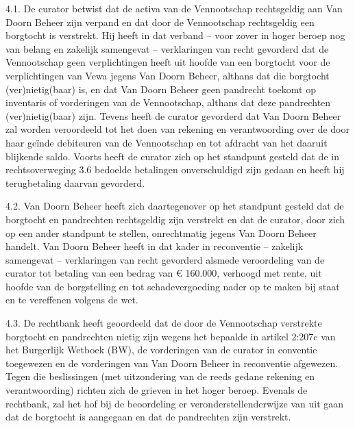 \documentclass[
  dutch,
  a4paper,
]{article}
\begin{document}
4.1. De curator betwist dat de activa van de Vennootschap rechtsgeldig aan Van Doorn Beheer zijn verpand en dat door de Vennootschap rechtsgeldig een borgtocht is verstrekt. Hij heeft in dat verband -- voor zover in hoger beroep nog van belang en zakelijk samengevat -- verklaringen van recht gevorderd dat de Vennootschap geen verplichtingen heeft uit hoofde van een borgtocht voor de verplichtingen van Vewa jegens Van Doorn Beheer, althans dat die borgtocht (ver)nietig(baar) is, en dat Van Doorn Beheer geen pandrecht toekomt op inventaris of vorderingen van de Vennootschap, althans dat deze pandrechten (ver)nietig(baar) zijn. Tevens heeft de curator gevorderd dat Van Doorn Beheer zal worden veroordeeld tot het doen van rekening en verantwoording over de door haar geïnde debiteuren van de Vennootschap en tot afdracht van het daaruit blijkende saldo. Voorts heeft de curator zich op het standpunt gesteld dat de in rechtsoverweging 3.6 bedoelde betalingen onverschuldigd zijn gedaan en heeft hij terugbetaling daarvan gevorderd.

4.2. Van Doorn Beheer heeft zich daartegenover op het standpunt gesteld dat de borgtocht en pandrechten rechtsgeldig zijn verstrekt en dat de curator, door zich op een ander standpunt te stellen, onrechtmatig jegens Van Doorn Beheer handelt. Van Doorn Beheer heeft in dat kader in reconventie -- zakelijk samengevat -- verklaringen van recht gevorderd alsmede veroordeling van de curator tot betaling van een bedrag van € 160.000, verhoogd met rente, uit hoofde van de borgstelling en tot schadevergoeding nader op te maken bij staat en te vereffenen volgens de wet.

4.3. De rechtbank heeft geoordeeld dat de door de Vennootschap verstrekte borgtocht en pandrechten nietig zijn wegens het bepaalde in artikel 2:207c van het Burgerlijk Wetboek (BW), de vorderingen van de curator in conventie toegewezen en de vorderingen van Van Doorn Beheer in reconventie afgewezen. Tegen die beslissingen (met uitzondering van de reeds gedane rekening en verantwoording) richten zich de grieven in het hoger beroep. Evenals de rechtbank, zal het hof bij de beoordeling er veronderstellenderwijze van uit gaan dat de borgtocht is aangegaan en dat de pandrechten zijn verstrekt.
\end{document}
